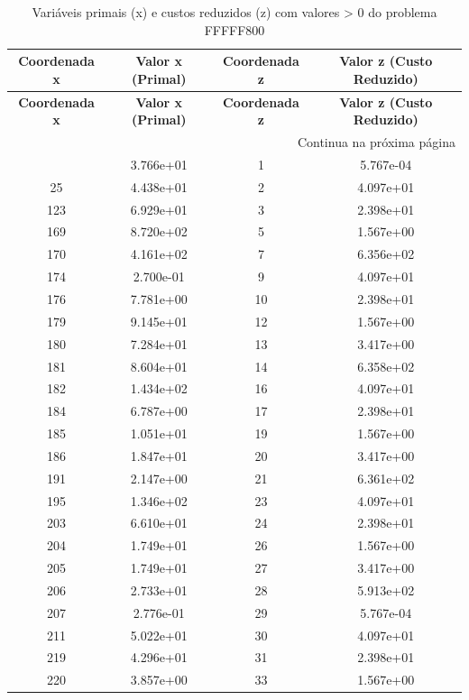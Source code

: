 \documentclass[12pt]{article}
\begin{document}
\begin{longtable}{@{}cccc@{}}
\caption{Variáveis primais (x) e custos reduzidos (z) com valores > 0 do problema FFFFF800} \\
\toprule
\textbf{Coordenada x} & \textbf{Valor x (Primal)} & \textbf{Coordenada z} & \textbf{Valor z (Custo Reduzido)} \\
\midrule
\endfirsthead

\toprule
\textbf{Coordenada x} & \textbf{Valor x (Primal)} & \textbf{Coordenada z} & \textbf{Valor z (Custo Reduzido)} \\
\midrule
\endhead

\midrule \multicolumn{4}{r}{{Continua na próxima página}} \\ \midrule
\endfoot

\bottomrule
\endlastfoot
18 & 3.766e+01 & 1 & 5.767e-04 \\
25 & 4.438e+01 & 2 & 4.097e+01 \\
123 & 6.929e+01 & 3 & 2.398e+01 \\
169 & 8.720e+02 & 5 & 1.567e+00 \\
170 & 4.161e+02 & 7 & 6.356e+02 \\
174 & 2.700e-01 & 9 & 4.097e+01 \\
176 & 7.781e+00 & 10 & 2.398e+01 \\
179 & 9.145e+01 & 12 & 1.567e+00 \\
180 & 7.284e+01 & 13 & 3.417e+00 \\
181 & 8.604e+01 & 14 & 6.358e+02 \\
182 & 1.434e+02 & 16 & 4.097e+01 \\
184 & 6.787e+00 & 17 & 2.398e+01 \\
185 & 1.051e+01 & 19 & 1.567e+00 \\
186 & 1.847e+01 & 20 & 3.417e+00 \\
191 & 2.147e+00 & 21 & 6.361e+02 \\
195 & 1.346e+02 & 23 & 4.097e+01 \\
203 & 6.610e+01 & 24 & 2.398e+01 \\
204 & 1.749e+01 & 26 & 1.567e+00 \\
205 & 1.749e+01 & 27 & 3.417e+00 \\
206 & 2.733e+01 & 28 & 5.913e+02 \\
207 & 2.776e-01 & 29 & 5.767e-04 \\
211 & 5.022e+01 & 30 & 4.097e+01 \\
219 & 4.296e+01 & 31 & 2.398e+01 \\
220 & 3.857e+00 & 33 & 1.567e+00 \\

\end{longtable}
\end{document}
